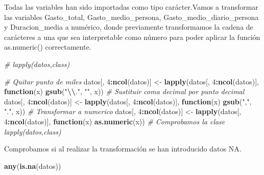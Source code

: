 \documentclass[data,article,submit,moreauthors,pdftex]{Definitions/mdpi}
\newenvironment{Shaded}{\begin{snugshade}}{\end{snugshade}}
\newcommand{\CommentTok}[1]{\textcolor[rgb]{0.56,0.35,0.01}{\textit{#1}}}
\newcommand{\ControlFlowTok}[1]{\textcolor[rgb]{0.13,0.29,0.53}{\textbf{#1}}}
\newcommand{\DecValTok}[1]{\textcolor[rgb]{0.00,0.00,0.81}{#1}}
\newcommand{\FunctionTok}[1]{\textcolor[rgb]{0.13,0.29,0.53}{\textbf{#1}}}
\newcommand{\NormalTok}[1]{#1}
\newcommand{\OtherTok}[1]{\textcolor[rgb]{0.56,0.35,0.01}{#1}}
\newcommand{\SpecialCharTok}[1]{\textcolor[rgb]{0.81,0.36,0.00}{\textbf{#1}}}
\newcommand{\StringTok}[1]{\textcolor[rgb]{0.31,0.60,0.02}{#1}}
\begin{document}
Todas las variables han sido importadas como tipo carácter.Vamos a
transformar las variables Gasto\_total, Gasto\_medio\_persona,
Gasto\_medio\_diario\_persona y Duracion\_media a numérico, donde
previamente transformamos la cadena de carácteres a una que sea
interpretable como número para poder aplicar la función as.numeric()
correctamente.

\begin{Shaded}
\begin{Highlighting}[]
\CommentTok{\# lapply(datos,class)}
\end{Highlighting}
\end{Shaded}

\begin{Shaded}
\begin{Highlighting}[]
\CommentTok{\# Quitar punto de miles}
\NormalTok{datos[, }\DecValTok{4}\SpecialCharTok{:}\FunctionTok{ncol}\NormalTok{(datos)] }\OtherTok{\textless{}{-}} \FunctionTok{lapply}\NormalTok{(datos[, }\DecValTok{4}\SpecialCharTok{:}\FunctionTok{ncol}\NormalTok{(datos)], }\ControlFlowTok{function}\NormalTok{(x) }\FunctionTok{gsub}\NormalTok{(}\StringTok{"}\SpecialCharTok{\textbackslash{}\textbackslash{}}\StringTok{."}\NormalTok{,}
    \StringTok{""}\NormalTok{, x))}
\CommentTok{\# Sustituir coma decimal por punto decimal}
\NormalTok{datos[, }\DecValTok{4}\SpecialCharTok{:}\FunctionTok{ncol}\NormalTok{(datos)] }\OtherTok{\textless{}{-}} \FunctionTok{lapply}\NormalTok{(datos[, }\DecValTok{4}\SpecialCharTok{:}\FunctionTok{ncol}\NormalTok{(datos)], }\ControlFlowTok{function}\NormalTok{(x) }\FunctionTok{gsub}\NormalTok{(}\StringTok{","}\NormalTok{,}
    \StringTok{"."}\NormalTok{, x))}
\CommentTok{\# Transformar a numerico}
\NormalTok{datos[, }\DecValTok{4}\SpecialCharTok{:}\FunctionTok{ncol}\NormalTok{(datos)] }\OtherTok{\textless{}{-}} \FunctionTok{lapply}\NormalTok{(datos[, }\DecValTok{4}\SpecialCharTok{:}\FunctionTok{ncol}\NormalTok{(datos)], }\ControlFlowTok{function}\NormalTok{(x) }\FunctionTok{as.numeric}\NormalTok{(x))}
\CommentTok{\# Comprobamos la clase lapply(datos,class)}
\end{Highlighting}
\end{Shaded}

Comprobamos si al realizar la transformación se han introducido datos
NA.

\begin{Shaded}
\begin{Highlighting}[]
\FunctionTok{any}\NormalTok{(}\FunctionTok{is.na}\NormalTok{(datos))}
\end{Highlighting}
\end{Shaded}
\end{document}
